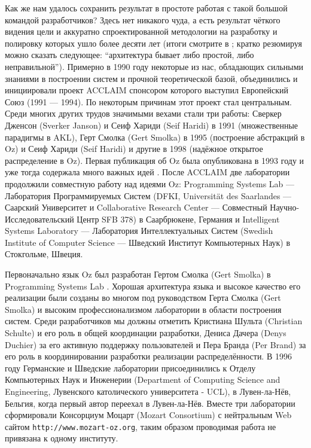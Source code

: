 Как же нам удалось сохранить результат в простоте работая с такой большой командой разработчиков? Здесь нет никакого чуда, а есть результат чёткого видения цели и аккуратно спроектированной методологии на разработку и полировку которых ушло более десяти лет (итоги смотрите в \cite{196}; кратко резюмируя можно сказать следующее: ``архитектура бывает либо простой, либо неправильной''). Примерно в 1990 году некоторые из нас, обладающих сильными знаниями в построении систем и прочной теоретической базой, объединились и инициировали проект ACCLAIM спонсором которого выступил Европейский Союз (1991 --- 1994). По некоторым причинам этот проект стал центральным. Среди многих других трудов значимыми вехами стали три работы: Сверкер Дженсон (Sverker Janson) и Сеиф Хариди (Seif Haridi) в 1991 \cite{93} (множественные парадигмы в AKL), Герт Смолка (Gert Smolka) в 1995 \cite{180} (построение абстракций в Oz) и Сеиф Хариди (Seif Haridi) и другие в 1998 \cite{72} (надёжное открытое распределение в Oz). Первая публикация об Oz была опубликована в 1993 году и уже тогда содержала много важных идей \cite{80}. После ACCLAIM две лаборатории продолжили совместную работу над идеями Oz: Programming Systems Lab --- Лаборатория Программируемых Систем (DFKI, Universit{\"a}t des Saarlandes --- Саарский Университет и Collaborative Research Center --- Совместный Научно-Исследовательский Центр SFB 378) в Саарбрюкене, Германия и Intelligent Systems Laboratory --- Лаборатория Интеллектуальных Систем (Swedish Institute of Computer Science --- Шведский Институт Компьютерных Наук) в Стокгольме, Швеция.

Первоначально язык Oz был разработан Гертом Смолка (Gert Smolka) в Programming Systems Lab \cite{79, 173, 179, 81, 180, 74, 172}. Хорошая архитектура языка и высокое качество его реализации были созданы во многом под руководством Герта Смолка (Gert Smolka) и высоким профессионализмом лаборатории в области построения систем. Среди разработчиков мы должны отметить Кристиана Шульта (Christian Schulte) и его роль в общей координации разработки, Дениса Дачера (Denys Duchier) за его активную поддержку пользователей и Пера Бранда (Per Brand) за его роль в координировании разработки реализации распределённости. В 1996 году Германские и Шведские лаборатории присоединились к Отделу Компьютерных Наук и Инженерии (Department of Computing Science and Engineering, Лувенского католического университета - UCL), в Лувен-ла-Нёв, Бельгия, когда первый автор переехал в Лувен-ла-Нёв. Вместе три лаборатории сформировали Консорциум Моцарт (Mozart Consortium) с нейтральным Web сайтом \verb|http://www.mozart-oz.org|, таким образом проводимая работа не привязана к одному институту.

